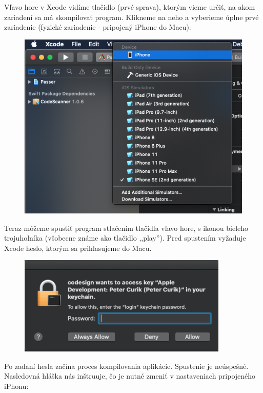 \noindent Vľavo hore v Xcode vidíme tlačidlo (prvé sprava), ktorým vieme určiť, na akom zariadení sa má skompilovať program. Klikneme na neho a vyberieme úplne prvé zariadenie (fyzické zariadenie - pripojený iPhone do Macu):

\begin{figure}[H]
  \centering
  \includegraphics[width=14cm]{img/tutorial6.png}
  \label{tutorial6}
\end{figure}

Teraz môžeme spustiť program stlačením tlačidla vľavo hore, s ikonou bieleho trojuholníka (všobecne známe ako tlačidlo ,,play''). Pred spustením vyžaduje Xcode heslo, ktorým sa prihlasujeme do Macu.

\begin{figure}[H]
  \centering
  \includegraphics[width=10cm]{img/tutorial7.png}
  \label{tutorial7}
\end{figure}

Po zadaní hesla začína proces kompilovania aplikácie. Spustenie je neúspešné. Nasledovná hláška nás inštruuje, čo je nutné zmeniť v nastaveniach pripojeného iPhonu: 


